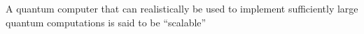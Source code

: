A quantum computer that can realistically be used to implement sufficiently large quantum computations is said to be “scalable”